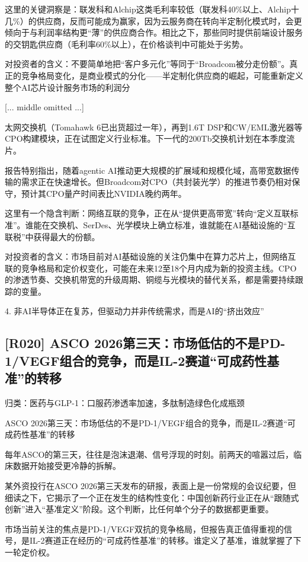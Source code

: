 \documentclass[11pt]{ctexart}
\begin{document}
这里的关键洞察是：联发科和Alchip这类毛利率较低（联发科40\%以上、Alchip十几\%）的供应商，反而可能成为赢家，因为云服务商在转向半定制化模式时，会更倾向于与利润率结构更“薄”的供应商合作。相比之下，那些同时提供前端设计服务的交钥匙供应商（毛利率60\%以上），在价格谈判中可能处于劣势。

对投资者的含义：不要简单地把“客户多元化”等同于“Broadcom被分走份额”。真正的竞争格局变化，是商业模式的分化——半定制化供应商的崛起，可能重新定义整个AI芯片设计服务市场的利润分

[... middle omitted ...]

太网交换机（Tomahawk 6已出货超过一年），再到1.6T DSP和CW/EML激光器等CPO构建模块，正在试图定义行业标准。下一代的200Tb交换机计划在本季度流片。

报告特别指出，随着agentic AI推动更大规模的扩展域和规模化域，高带宽数据传输的需求正在快速增长。但Broadcom对CPO（共封装光学）的推进节奏仍相对保守，预计其CPO量产时间表比NVIDIA晚约两年。

这里有一个隐含判断：网络互联的竞争，正在从“提供更高带宽”转向“定义互联标准”。谁能在交换机、SerDes、光学模块上确立标准，谁就能在AI基础设施的“互联税”中获得最大的份额。

对投资者的含义：市场目前对AI基础设施的关注仍集中在算力芯片上，但网络互联的竞争格局和定价权变化，可能在未来12至18个月内成为新的投资主线。CPO的渗透节奏、交换机带宽的升级周期、铜缆与光模块的替代关系，都是需要持续跟踪的变量。

4. 非AI半导体正在复苏，但驱动力并非传统需求，而是AI的“挤出效应”

\subsection{[R020] ASCO 2026第三天：市场低估的不是PD-1/VEGF组合的竞争，而是IL-2赛道“可成药性基准”的转移}
{\small\color{refgray}归类：医药与GLP-1：口服药渗透率加速，多肽制造绿色化成瓶颈}

ASCO 2026第三天：市场低估的不是PD-1/VEGF组合的竞争，而是IL-2赛道“可成药性基准”的转移

每年ASCO的第三天，往往是泡沫退潮、信号浮现的时刻。前两天的喧嚣过后，临床数据开始接受更冷静的拆解。

某外资投行在ASCO 2026第三天发布的研报，表面上是一份常规的会议纪要，但细读之下，它揭示了一个正在发生的结构性变化：中国创新药行业正在从“跟随式创新”进入“基准定义”阶段。这个判断，比任何单个分子的数据都更重要。

市场当前关注的焦点是PD-1/VEGF双抗的竞争格局，但报告真正值得重视的信号，是IL-2赛道正在经历的“可成药性基准”的转移。谁定义了基准，谁就掌握了下一轮定价权。
\end{document}
